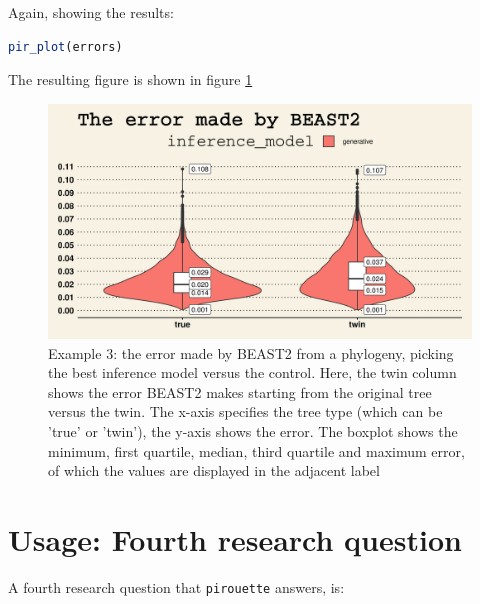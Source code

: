 \documentclass{article}
\begin{document}
Again, showing the results:

\begin{lstlisting}[language=R, floatplacement=H, frame=single]
pir_plot(errors)
\end{lstlisting}

The resulting figure is shown in figure \ref{fig:example_3}

\begin{figure}[h]
  \includegraphics[width=\textwidth]{figure_example_3.png}
  \caption{
    Example 3: the error made by BEAST2 from a phylogeny, picking the best inference model versus the control.
    Here, the twin column shows the error BEAST2 makes starting from the original tree versus the twin. 
    The x-axis specifies the tree type (which can be 'true' or 'twin'), the y-axis shows the error.
    The boxplot shows the minimum, first quartile, median, third 
    quartile and maximum error, of which the values are displayed 
    in the adjacent label
  }
  \label{fig:example_3}
\end{figure}

\section{Usage: Fourth research question}

A fourth research question that \verb;pirouette; answers, is:
\end{document}

